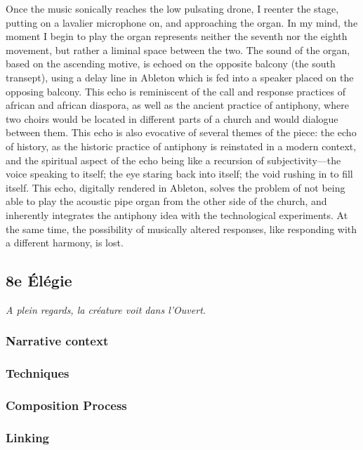 \documentclass[12pt,twoside,maitrise]{dms}
\theoremstyle{definition}
\begin{document}
Once the music sonically reaches the low pulsating drone, I reenter the stage, putting on a lavalier microphone on, and approaching the organ.
In my mind, the moment I begin to play the organ represents neither the seventh nor the eighth movement, but rather a liminal space between the two.
The sound of the organ, based on the ascending motive, is echoed on the opposite balcony (the south transept), using a delay line in Ableton which is fed into a speaker placed on the opposing balcony.
This echo is reminiscent of the call and response practices of african and african diaspora, as well as the ancient practice of antiphony, where two choirs would be located in different parts of a church and would dialogue between them.
This echo is also evocative of several themes of the piece: the echo of history, as the historic practice of antiphony is reinstated in a modern context, and the spiritual aspect of the echo being like a recursion of subjectivity—the voice speaking to itself; the eye staring back into itself; the void rushing in to fill itself.
This echo, digitally rendered in Ableton, solves the problem of not being able to play the acoustic pipe organ from the other side of the church, and inherently integrates the antiphony idea with the technological experiments.
At the same time, the possibility of musically altered responses, like responding with a different harmony, is lost.

\subsection{8e Élégie}

\epigraph{\textit{A plein regards, la créature voit dans l’Ouvert.}}{}

\subsubsection{Narrative context}

\subsubsection{Techniques}

\subsubsection{Composition Process}

\subsubsection{Linking}
\end{document}

